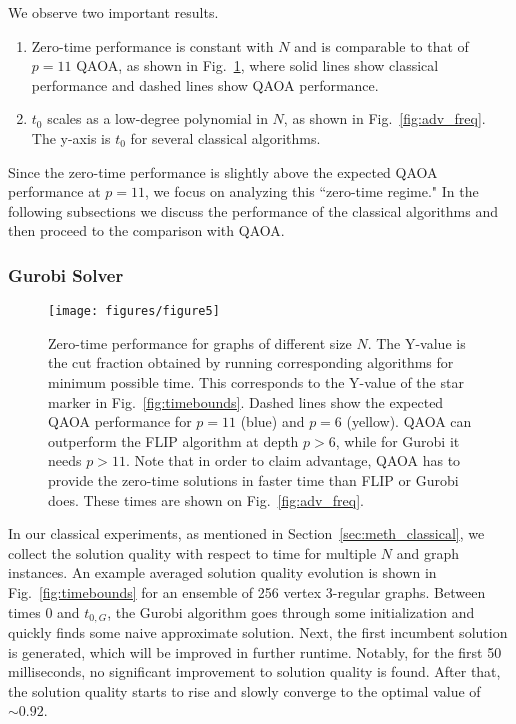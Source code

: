 We observe two important results.
\begin{enumerate}
    \item Zero-time performance is constant with $N$ and is comparable to that of $p=11$ QAOA,
    as shown in Fig.~\ref{fig:t0_cutf}, where solid lines show classical performance and dashed lines show QAOA performance.
    \item $t_0$ scales as a low-degree polynomial in $N$, as shown in Fig.~\ref{fig:adv_freq}. The y-axis is $t_0$ for several classical algorithms.
\end{enumerate}

Since the zero-time performance is slightly above the expected QAOA performance at $p=11$, we focus on analyzing this ``zero-time regime."
In the following subsections we discuss the performance of the classical algorithms and then proceed to the comparison with QAOA.

\subsubsection{Gurobi Solver}


\begin{figure}
    \texttt{[image: figures/figure5]}
    \caption{
    Zero-time performance for graphs of different size $N$.
    The Y-value is the cut fraction obtained by running corresponding algorithms for minimum possible time. This corresponds to the Y-value of the star marker in Fig.~\ref{fig:timebounds}.
    Dashed lines show the expected QAOA performance for $p=11$ (blue) and $p=6$ (yellow). QAOA can outperform the FLIP algorithm at depth $p>6$, while for Gurobi it needs $p>11$.
    Note that in order to claim advantage, QAOA has to provide the zero-time solutions in faster time than FLIP or Gurobi does. These times are shown on Fig.~\ref{fig:adv_freq}.
    }
    \label{fig:t0_cutf}
\end{figure}


In our classical experiments, as mentioned in Section~\ref{sec:meth_classical},
we collect the solution quality with respect to time for multiple $N$ and graph instances.
An example averaged solution quality evolution is shown in Fig.~\ref{fig:timebounds} for an ensemble of 256 vertex 3-regular graphs. Between times 0 and $t_{0, G}$, the Gurobi algorithm goes through some initialization and quickly finds some naive approximate solution. Next, the first incumbent solution is generated, which will be improved in further runtime. Notably, for the first 50 milliseconds, no significant improvement to solution quality is found. After that, the solution quality starts to rise and slowly converge to the optimal value of~$\sim 0.92$.



